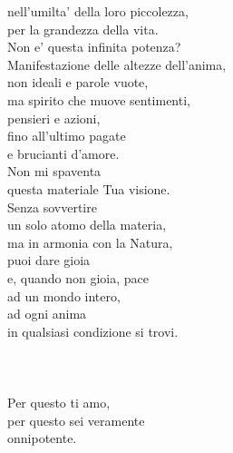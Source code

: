 \begin{haiku}
nell'umilta' della loro piccolezza,\\
per la grandezza della vita.\\
Non e' questa infinita potenza?\\
Manifestazione delle altezze dell'anima,\\
non ideali e parole vuote,\\
ma spirito che muove sentimenti, \\
pensieri e azioni,\\
fino all'ultimo pagate\\
e brucianti d'amore.\\
Non mi spaventa \\
    questa materiale Tua visione.\\
Senza sovvertire \\
    un solo atomo della materia,\\
ma in armonia con la Natura,\\
    puoi dare gioia \\
    e, quando non gioia, pace\\
ad un mondo intero, \\
    ad ogni anima\\
in qualsiasi condizione si trovi.\\
\leavevmode\\
\leavevmode\\
\leavevmode\\
Per questo ti amo,\\
per questo sei veramente \\
    onnipotente.\\
\end{haiku}


